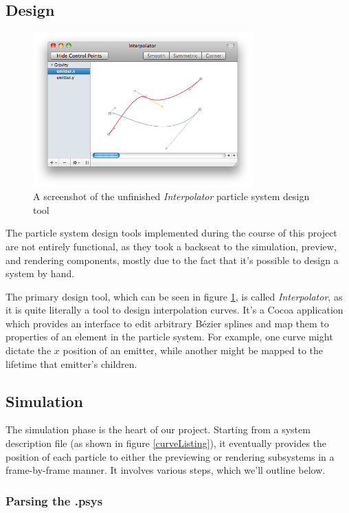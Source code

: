 \documentclass{acmsiggraph}
\begin{document}
\subsection{Design}

\begin{figure}
    \includegraphics[width=84.5mm]{interpolator.png}
    \caption{A screenshot of the unfinished {\it Interpolator} particle system design tool}
    \label{fig:interpolator}
\end{figure}

The particle system design tools implemented during the course of this project are not entirely functional, as they took a backseat to the simulation, preview, and rendering components, mostly due to the fact that it's possible to design a system by hand.

The primary design tool, which can be seen in figure \ref{fig:interpolator}, is called {\it Interpolator}, as it is quite literally a tool to design interpolation curves. It's a Cocoa application which provides an interface to edit arbitrary B\'{e}zier splines and map them to properties of an element in the particle system. For example, one curve might dictate the $x$ position of an emitter, while another might be mapped to the lifetime that emitter's children.

\subsection{Simulation}

The simulation phase is the heart of our project. Starting from a system description file (as shown in figure \ref{curveListing}), it eventually provides the position of each particle to either the previewing or rendering subsystems in a frame-by-frame manner. It involves various steps, which we'll outline below.

\subsubsection{Parsing the .psys}
\end{document}

